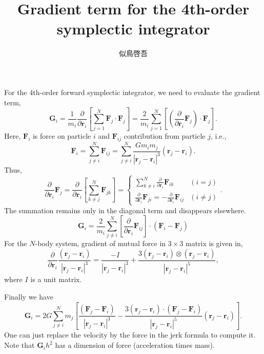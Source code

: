 \documentclass[11pt]{jsarticle}
\title{Gradient term for the 4th-order symplectic integrator}
\author{似鳥啓吾}
\begin{document}
\maketitle

For the 4th-order forward symplectic integrator, we need to evaluate the
gradient term,
\begin{equation}
\bm G_i = \frac{1}{m_i} \frac{\partial}{\partial \bm r_i}
\left[ \sum_{j=1}^N \bm F_j \cdot \bm F_j \right]
= \frac{2}{m_i} \sum_{j=1}^N \left[ \left( \frac{\partial}{\partial \bm r_i} \bm F_j \right) \cdot  \bm F_j \right].
\end{equation}
Here, $\bm F_i$ is force on particle $i$ and $\bm F_{ij}$ contribution from
particle $j$, i.e.,
\begin{equation}
\bm F_i = \sum_{j \neq i}^N \bm F_{ij}
= \sum_{j \neq i}^N \frac{G m_i m_j}{| \bm r_j - \bm r_i |^3}(\bm r_j - \bm r_i).
\end{equation}
Thus,
\begin{equation}
\frac{\partial}{\partial \bm r_i} \bm F_j 
= 
\frac{\partial}{\partial \bm r_i} \left[ \sum_{k \neq j}^N \bm F_{jk} \right]
=
\begin{cases}
\displaystyle \sum_{k \neq i}^N \frac{\partial}{\partial \bm r_i} \bm F_{ik} & (i = j) \\
\displaystyle \frac{\partial}{\partial \bm r_i} \bm F_{ji} = - \frac{\partial}{\partial \bm r_i} \bm F_{ij} & (i \neq j)
\end{cases}.
\end{equation}
The summation remains only in the diagonal term and disappears elsewhere.
\begin{equation}
\bm G_i = \frac{2}{m_i} \sum_{j \neq i}^N \left[ \frac{\partial}{\partial \bm r_i} \bm F_{ij} \right] \cdot \left(\bm F_i - \bm F_j\right)
\end{equation}
For the $N$-body system, gradient of mutual force in $3 \times 3$ matrix is given in,
\begin{equation}
\frac{\partial}{\partial \bm r_i} \frac{(\bm r_j - \bm r_i)}{| \bm r_j - \bm r_i |^3}
=
\frac{-I}{| \bm r_j - \bm r_i |^3}
+
\frac{3 (\bm r_j - \bm r_i) \otimes (\bm r_j - \bm r_i)}{| \bm r_j - \bm r_i |^5},
\end{equation}
where $I$ is a unit matrix.

Finally we have
\begin{equation}
\bm G_i = 2 G \sum_{j \neq i}^N 
  m_j \left[ \frac{(\bm F_j - \bm F_i)}{| \bm r_j - \bm r_i |^3} - \frac{3 (\bm r_j - \bm r_i) \cdot (\bm F_j - \bm F_i)}{| \bm r_j - \bm r_i |^5} (\bm r_j - \bm r_i) \right].
\end{equation}
One can just replace the velocity by the force in the jerk formula to compute it.
Note that $\bm G_i h^2$ has a dimension of force (acceleration times mass).
\end{document}
